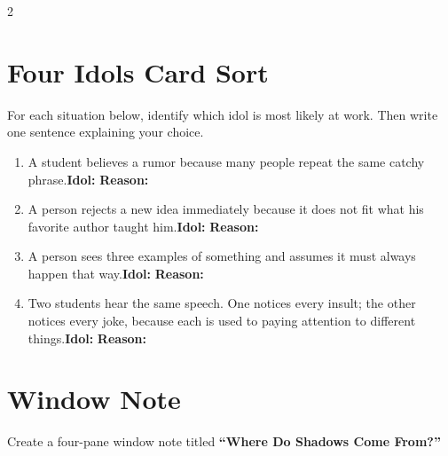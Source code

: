 \documentclass[12pt]{article}
\begin{document}
\begin{multicols}{2}
\section*{Four Idols Card Sort}
For each situation below, identify which idol is most likely at work. Then write one sentence explaining your choice.

\begin{enumerate}[leftmargin=*, itemsep=0.35em]
\item A student believes a rumor because many people repeat the same catchy phrase.\newline \textbf{Idol:} \underline{\hspace{0.7in}}\newline \textbf{Reason:} \underline{\hspace{1.9in}}
\item A person rejects a new idea immediately because it does not fit what his favorite author taught him.\newline \textbf{Idol:} \underline{\hspace{0.7in}}\newline \textbf{Reason:} \underline{\hspace{1.9in}}
\item A person sees three examples of something and assumes it must always happen that way.\newline \textbf{Idol:} \underline{\hspace{0.7in}}\newline \textbf{Reason:} \underline{\hspace{1.9in}}
\item Two students hear the same speech. One notices every insult; the other notices every joke, because each is used to paying attention to different things.\newline \textbf{Idol:} \underline{\hspace{0.7in}}\newline \textbf{Reason:} \underline{\hspace{1.9in}}
\end{enumerate}

\section*{Window Note}
Create a four-pane window note titled \textbf{``Where Do Shadows Come From?''}


\end{multicols}
\end{document}
